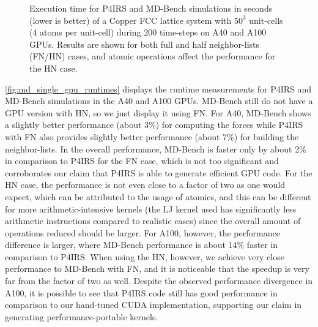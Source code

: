 \documentclass[preprint,12pt]{elsarticle}
\begin{document}
\begin{figure}[t]
\vspace{-3ex}
	\caption{Execution time for P4IRS and MD-Bench simulations in seconds (lower is better) of a Copper FCC lattice system with $50^{3}$ unit-cells (4 atoms per unit-cell) during 200 time-steps on A40 and A100 GPUs. Results are shown for both full and half neighbor-lists (FN/HN) cases, and atomic operations affect the performance for the HN case.}
\vspace{-2ex}
\centering
\label{fig:md_single_gpu_runtimes}
\end{figure}

\autoref{fig:md_single_gpu_runtimes} displays the runtime measurements for P4IRS and MD-Bench simulations in the A40 and A100 GPUs.
MD-Bench still do not have a GPU version with \ac{HN}, so we just display it using \ac{FN}.
For A40, MD-Bench shows a slightly better performance (about 3\%) for computing the forces while P4IRS with \ac{FN} also provides slightly better performance (about 7\%) for building the neighbor-lists.
In the overall performance, MD-Bench is faster only by about 2\% in comparison to P4IRS for the \ac{FN} case, which is not too significant and corroborates our claim that P4IRS is able to generate efficient GPU code.
For the \ac{HN} case, the performance is not even close to a factor of two as one would expect, which can be attributed to the usage of atomics, and this can be different for more arithmetic-intensive kernels (the \ac{LJ} kernel used has significantly less arithmetic instructions compared to realistic cases) since the overall amount of operations reduced should be larger.
For A100, however, the performance difference is larger, where MD-Bench performance is about 14\% faster in comparison to P4IRS.
When using the \ac{HN}, however, we achieve very close performance to MD-Bench with \ac{FN}, and it is noticeable that the speedup is very far from the factor of two as well.
Despite the observed performance divergence in A100, it is possible to see that P4IRS code still has good performance in comparison to our hand-tuned CUDA implementation, supporting our claim in generating performance-portable kernels.
\end{document}
